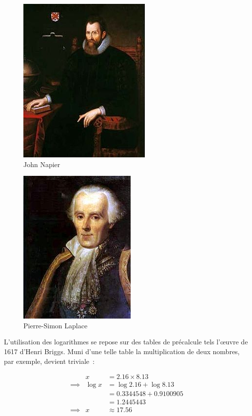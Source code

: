 \begin{minipage}[H]{0.49\linewidth}
  \begin{figure}[H]
  \centering
  \includegraphics[height=0.15\paperheight]{../resources/illustrations/napier}
  \caption{John Napier}
  \end{figure}
\end{minipage}
\begin{minipage}[H]{0.49\linewidth}
  \begin{figure}[H]
  \centering
  \includegraphics[height=0.15\paperheight]{../resources/illustrations/laplace}
  \caption{Pierre-Simon Laplace}
  \end{figure}
\end{minipage}
L'utilisation des logarithmes se repose sur des tables de précalcule tels l'\oe{}uvre de 1617 d'Henri Briggs. Muni d'une telle table la multiplication de deux nombres, par exemple, devient triviale~:

\begin{eqnarray}
                    &x            &= 2.16\times{8.13}              \nonumber \\
        \implies{}  &\log{x}      &= \log{2.16}+\log{8.13}         \nonumber \\
                    &             &= 0.3344548 + 0.9100905         \nonumber \\
                    &             &= 1.2445443                     \nonumber \\
        \implies{}  &x            &\approx{17.56}                   \nonumber \\
\end{eqnarray}

